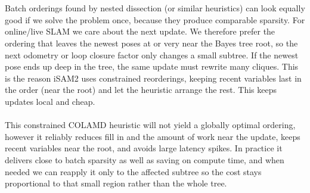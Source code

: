 \\ \\
Batch orderings found by nested dissection (or similar heuristics) can look equally good if we solve the problem once, because they produce comparable sparsity. For online/live \gls{SLAM} we care about the next update. We therefore prefer the ordering that leaves the newest poses at or very near the Bayes tree root, so the next odometry or loop closure factor only changes a small subtree. If the newest pose ends up deep in the tree, the same update must rewrite many cliques. This is the reason \gls{iSAM}2 uses constrained reorderings, keeping recent variables last in the order (near the root) and let the heuristic arrange the rest. This keeps updates local and cheap. \cite{Bayes_tree_for_SLAM_paper}
\\ \\
This constrained \gls{COLAMD} heuristic will not yield a globally optimal ordering, however it reliably reduces fill in and the amount of work near the update, keeps recent variables near the root, and avoids large latency spikes. In practice it delivers close to batch sparsity as well as saving on compute time, and when needed we can reapply it only to the affected subtree so the cost stays proportional to that small region rather than the whole tree.



